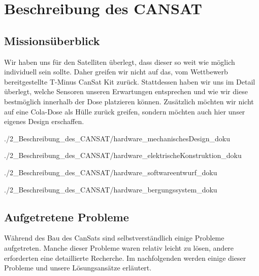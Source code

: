 \section{Beschreibung des CANSAT}


\subsection{Missionsüberblick}
Wir haben uns für den Satelliten überlegt, dass dieser so weit wie möglich individuell sein sollte. Daher greifen wir nicht auf das, vom Wettbewerb bereitgestellte T-Minus CanSat Kit zurück. Stattdessen haben wir uns im Detail überlegt, welche Sensoren unseren Erwartungen entsprechen und wie wir diese bestmöglich innerhalb der Dose platzieren können. Zusätzlich möchten wir nicht auf eine Cola-Dose als Hülle zurück greifen, sondern möchten auch hier unser eigenes Design erschaffen.

 {./2_Beschreibung_des_CANSAT/hardware_mechanischesDesign_doku}

 {./2_Beschreibung_des_CANSAT/hardware_elektrischeKonstruktion_doku}

 {./2_Beschreibung_des_CANSAT/hardware_softwareentwurf_doku}

 {./2_Beschreibung_des_CANSAT/hardware_bergungssystem_doku}

\subsection{Aufgetretene Probleme}
Während des Bau des CanSats sind selbstverständlich einige Probleme aufgetreten. Manche dieser Probleme waren relativ leicht zu lösen, andere erforderten eine detaillierte Recherche. Im nachfolgenden werden einige dieser Probleme und unsere Lösungsansätze erläutert.

